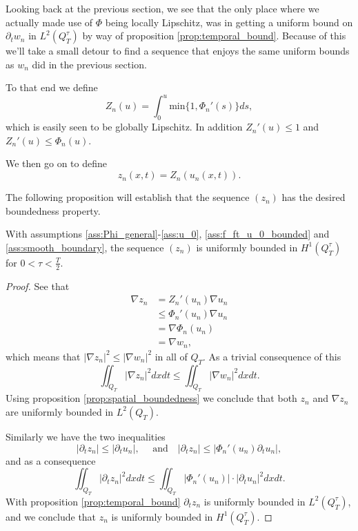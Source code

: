 \documentclass[11pt, a4paper]{article}
\begin{document}
Looking back at the previous section, we see that the only place where we actually made use of $\Phi$ being locally Lipschitz, was in getting a uniform bound on $\partial_t w_n$ in $L^2(Q_T^\tau)$ by way of proposition \ref{prop:temporal_bound}. Because of this we'll take a small detour to find a sequence that enjoys the same uniform bounds as $w_n$ did in the previous section.

To that end we define
\begin{equation}
Z_n(u) = \int_0^u \mathrm{min}\{1, \Phi_n'(s)\} ds,
\end{equation}
which is easily seen to be globally Lipschitz. In addition $Z_n'(u) \leq 1$ and $Z_n'(u) \leq \Phi_n(u)$.

We then go on to define
\begin{equation}
z_n(x,t) = Z_n(u_n(x,t)).
\end{equation}

The following proposition will establish that the sequence $(z_n)$ has the desired boundedness property.

\begin{proposition}
\label{prop:z_n_bounded_H1}
With assumptions \ref{ass:Phi_general}-\ref{ass:u_0}, \ref{ass:f_ft_u_0_bounded} and \ref{ass:smooth_boundary}, the sequence $(z_n)$ is uniformly bounded in $H^1(Q_T^\tau)$ for $0<\tau < \frac{T}{2}$.
\end{proposition} 

\begin{proof}
See that
\begin{align*}
\nabla z_n &= Z_n'(u_n)\nabla u_n \\
	&\leq \Phi_n'(u_n)\nabla u_n \\
	&= \nabla \Phi_n(u_n) \\
	&= \nabla w_n,
\end{align*}
which means that $|\nabla z_n|^2 \leq |\nabla w_n|^2$ in all of $Q_T$. As a trivial consequence of this
\begin{equation*}
\iint_{Q_T}|\nabla z_n|^2dxdt \leq \iint_{Q_T}|\nabla w_n|^2dxdt.
\end{equation*}
Using proposition \ref{prop:spatial_boundedness} we conclude that both $z_n$ and $\nabla z_n$ are uniformly bounded in $L^2(Q_T)$.

Similarly we have the two inequalities
\begin{equation*}
|\partial_t z_n | \leq |\partial_t u_n|, \quad \text{ and} \quad |\partial_t z_n| \leq |\Phi_n'(u_n) \partial_t u_n|,
\end{equation*}
and as a consequence
\begin{equation*}
\iint_{Q_T}|\partial_t z_n|^2 dxdt \leq \iint_{Q_T} |\Phi_n'(u_n)|\cdot |\partial_t u_n|^2dxdt.
\end{equation*}
With proposition \ref{prop:temporal_bound} $\partial_t z_n$ is uniformly bounded in $L^2(Q_T^\tau)$, and we conclude that $z_n$ is uniformly bounded in $H^1(Q_T^\tau)$.
\end{proof}
\end{document}
